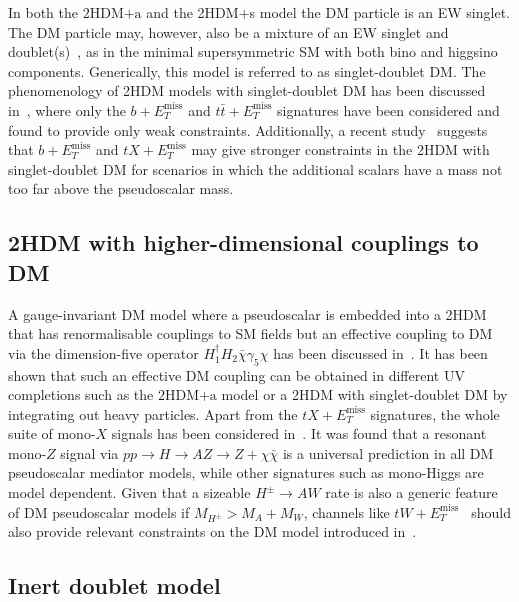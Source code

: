 \documentclass[a4paper, 11pt,notoc]{article}
\newcommand{\MET}{\ensuremath{E_T^\mathrm{miss}}\xspace}
\newcommand{\hdma}{\ensuremath{\textrm{2HDM+a}}\xspace}
\begin{document}
In both the \hdma and the 2HDM+s model the DM particle is  an EW singlet. The DM particle may, however, also be a mixture of an EW singlet and doublet(s)~\cite{Mahbubani:2005pt,Enberg:2007rp,Cohen:2011ec,Cheung:2013dua}, as in the minimal supersymmetric SM with both bino and higgsino components. Generically, this model is referred to as singlet-doublet DM. The phenomenology of 2HDM models with singlet-doublet DM has been discussed in~\cite{Berlin:2015wwa,Arcadi:2018pfo}, where only the $b+\MET$ and $t \bar t+\MET$ signatures have been considered and found to provide only weak constraints. Additionally, a recent study~\cite{Bauer:2017fsw} suggests that $b+\MET$ and $tX+\MET$ may give stronger constraints in the 2HDM with singlet-doublet DM for scenarios in which the additional scalars have a mass not too far above the pseudoscalar mass. 

\subsection{2HDM with  higher-dimensional couplings to DM}

A gauge-invariant DM model where a pseudoscalar is embedded into a 2HDM that has renormalisable couplings to SM fields but an effective coupling to DM via the dimension-five operator $H_1^\dagger H_2 \bar \chi \gamma_5 \chi$ has been  discussed in~\cite{Bauer:2017fsw}. It has been shown that  such an  effective DM coupling can be obtained in different UV completions such as the \hdma model or  a 2HDM with singlet-doublet DM by integrating out heavy particles. Apart from the $t X+\MET$ signatures, the whole suite of mono-$X$ signals has been considered in~\cite{Bauer:2017fsw}. It was found that a resonant mono-$Z$ signal via $pp \to H \to AZ \to  Z + \chi \bar \chi$ is a universal prediction in all DM pseudoscalar mediator models, while other signatures such as mono-Higgs are model dependent. Given that a sizeable $H^\pm \to A W$ rate is also a generic feature of DM pseudoscalar models if $M_{H^\pm} > M_A + M_W$, channels like $tW+\MET$~\cite{Pani:2017qyd} should also  provide relevant constraints on the DM model introduced in~\cite{Bauer:2017fsw}. 

\subsection{Inert doublet model}
\end{document}
